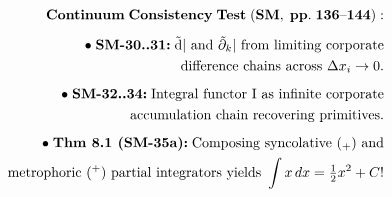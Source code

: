 \documentclass[preview]{standalone}
\begin{document}
\begin{align*}
\special{dvisvgm:raw <g id='unique000'>}\mathbf{Continuum\;Consistency\;Test\;(SM,\;pp.\;136\text{--}144):}\\[5pt]\bullet\;\textbf{SM-30..31:}\;\tilde{\mathrm{d}}|\text{ and }\tilde{\partial}_k|\text{ from limiting corporate}\\\;\;\text{difference chains across }\Delta x_i\to 0.\\[5pt]\bullet\;\textbf{SM-32..34:}\;\text{Integral functor }\mathrm{I}\text{ as infinite corporate}\\\;\;\text{accumulation chain recovering primitives.}\\[5pt]\bullet\;\textbf{Thm 8.1 (SM-35a):}\;\text{Composing syncolative }({}_+)\text{ and}\\\;\;\text{metrophoric }({}^+)\text{ partial integrators yields }\int x\,dx = \tfrac{1}{2}x^2 + C!\special{dvisvgm:raw </g>}
\end{align*}
\end{document}
